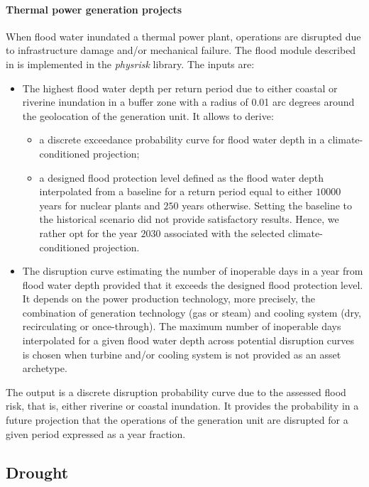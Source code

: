 \documentclass[a4paper,11pt]{extarticle} %
\theoremstyle{definition}
\begin{document}
\paragraph{Thermal power generation projects}
When flood water inundated a thermal power plant, operations are disrupted due to infrastructure damage and/or mechanical failure. The flood module described in \cite{LuoEtAl:2021,LuoEtAl:2023} is implemented in the \emph{physrisk} library. The inputs are:
\begin{itemize}
\item The highest flood water depth per return period due to either coastal or riverine inundation in a buffer zone with a radius of 0.01 arc degrees around the geolocation of the generation unit. It allows to derive:
\begin{itemize}
\item a discrete exceedance probability curve for flood water depth in a climate-conditioned projection;
\item a designed flood protection level defined as the flood water depth interpolated from a baseline for a return period equal to either $10000$ years for nuclear plants and $250$ years otherwise. Setting the baseline to the historical scenario did not provide satisfactory results. Hence, we rather opt for the year $2030$ associated with the selected climate-conditioned projection.
\end{itemize}
\item The disruption curve estimating the number of inoperable days in a year from flood water depth provided that it exceeds the designed flood protection level. It depends on the power production technology, more precisely, the combination of generation technology (gas or steam) and cooling system (dry, recirculating or once-through). The maximum number of inoperable days interpolated for a given flood water depth across potential disruption curves is chosen when turbine and/or cooling system is not provided as an asset archetype.
\end{itemize}
The output is a discrete disruption probability curve due to the assessed flood risk, that is, either riverine or coastal inundation. It provides the probability in a future projection that the operations of the generation unit are disrupted for a given period expressed as a year fraction.

\subsection{Drought}
\end{document}

